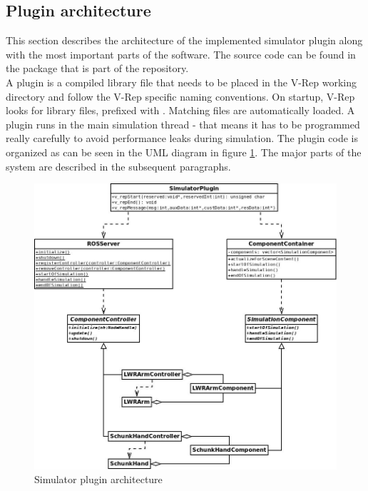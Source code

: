 
\subsection{Plugin architecture}
\label{sec:plugin_arch}

This section describes the architecture of the implemented simulator plugin along with the most important parts of the software. The source code can be found in the  package that is part of the  repository.\\

A plugin is a compiled library file that needs to be placed in the V-Rep working directory and follow the V-Rep specific naming conventions. On startup, V-Rep looks for library files, prefixed with . Matching files are automatically loaded. A plugin runs in the main simulation thread - that means it has to be programmed really carefully to avoid performance leaks during simulation. The plugin code is organized as can be seen in the UML diagram in figure \ref{fig:plugin_uml}. The major parts of the system are described in the subsequent paragraphs.

\begin{figure}
	\centering
  	\includegraphics[width=1.0\textwidth]{images/SimulatorPluginUML.jpg}
	\caption{Simulator plugin architecture}
	\label{fig:plugin_uml}
\end{figure}


